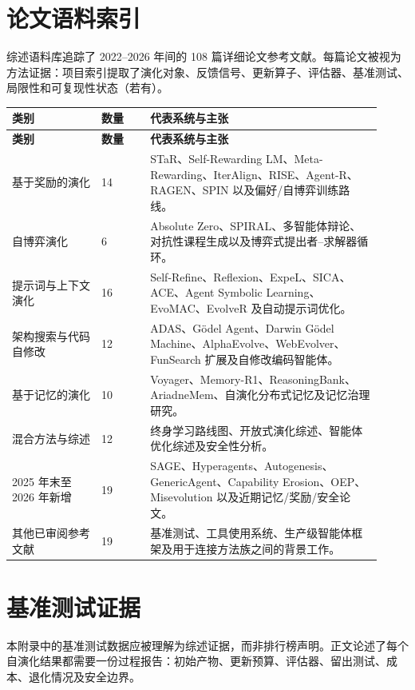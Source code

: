 \section{论文语料索引}
\label{app:papers}

综述语料库追踪了 2022--2026 年间的 108 篇详细论文参考文献。每篇论文被视为方法证据：项目索引提取了演化对象、反馈信号、更新算子、评估器、基准测试、局限性和可复现性状态（若有）。

{\TableTight
\begin{longtable}{@{}L{0.22\linewidth}L{0.12\linewidth}L{0.58\linewidth}@{}}
\toprule
\textbf{类别} & \textbf{数量} & \textbf{代表系统与主张} \\
\midrule
\endfirsthead
\toprule
\textbf{类别} & \textbf{数量} & \textbf{代表系统与主张} \\
\midrule
\endhead
\bottomrule
\endlastfoot
基于奖励的演化 & 14 & STaR、Self-Rewarding LM、Meta-Rewarding、IterAlign、RISE、Agent-R、RAGEN、SPIN 以及偏好/自博弈训练路线。 \\
自博弈演化 & 6 & Absolute Zero、SPIRAL、多智能体辩论、对抗性课程生成以及博弈式提出者--求解器循环。 \\
提示词与上下文演化 & 16 & Self-Refine、Reflexion、ExpeL、SICA、ACE、Agent Symbolic Learning、EvoMAC、EvolveR 及自动提示词优化。 \\
架构搜索与代码自修改 & 12 & ADAS、G\"{o}del Agent、Darwin G\"{o}del Machine、AlphaEvolve、WebEvolver、FunSearch 扩展及自修改编码智能体。 \\
基于记忆的演化 & 10 & Voyager、Memory-R1、ReasoningBank、AriadneMem、自演化分布式记忆及记忆治理研究。 \\
混合方法与综述 & 12 & 终身学习路线图、开放式演化综述、智能体优化综述及安全性分析。 \\
2025 年末至 2026 年新增 & 19 & SAGE、Hyperagents、Autogenesis、GenericAgent、Capability Erosion、OEP、Misevolution 以及近期记忆/奖励/安全论文。 \\
其他已审阅参考文献 & 19 & 基准测试、工具使用系统、生产级智能体框架及用于连接方法族之间的背景工作。 \\
\end{longtable}}

\section{基准测试证据}
\label{app:benchmarks}

本附录中的基准测试数据应被理解为综述证据，而非排行榜声明。正文论述了每个自演化结果都需要一份过程报告：初始产物、更新预算、评估器、留出测试、成本、退化情况及安全边界。

